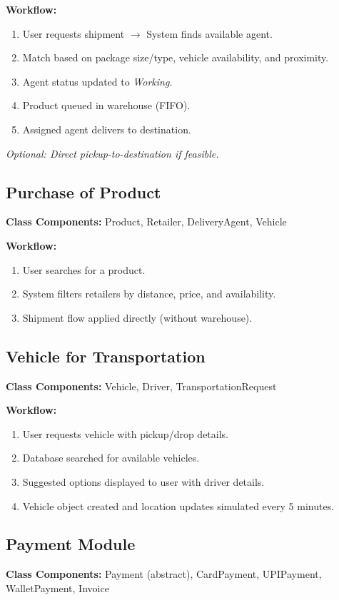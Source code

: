 \documentclass[12pt,a4paper]{article}
\begin{document}
\textbf{Workflow:}
\begin{enumerate}[leftmargin=*,noitemsep]
  \item User requests shipment \(\rightarrow\) System finds available agent.
  \item Match based on package size/type, vehicle availability, and proximity.
  \item Agent status updated to \textit{Working}.
  \item Product queued in warehouse (FIFO).
  \item Assigned agent delivers to destination.
\end{enumerate}

\textit{Optional: Direct pickup-to-destination if feasible.}

\subsection{Purchase of Product}
\textbf{Class Components:} Product, Retailer, DeliveryAgent, Vehicle

\textbf{Workflow:}
\begin{enumerate}[leftmargin=*,noitemsep]
  \item User searches for a product.
  \item System filters retailers by distance, price, and availability.
  \item Shipment flow applied directly (without warehouse).
\end{enumerate}

\subsection{Vehicle for Transportation}
\textbf{Class Components:} Vehicle, Driver, TransportationRequest

\textbf{Workflow:}
\begin{enumerate}[leftmargin=*,noitemsep]
  \item User requests vehicle with pickup/drop details.
  \item Database searched for available vehicles.
  \item Suggested options displayed to user with driver details.
  \item Vehicle object created and location updates simulated every 5 minutes.
\end{enumerate}

\subsection{Payment Module}
\textbf{Class Components:} Payment (abstract), CardPayment, UPIPayment, WalletPayment, Invoice
\end{document}
